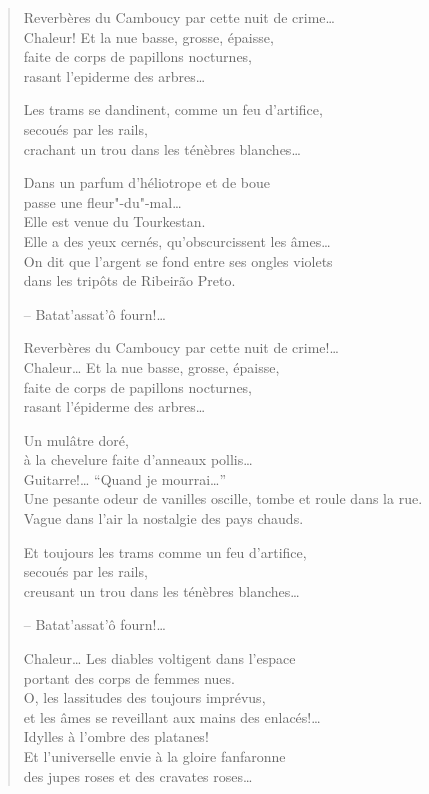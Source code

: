 \begin{verse}
Reverbères du Camboucy par cette nuit de crime\ldots{}\\
Chaleur! Et la nue basse, grosse, épaisse,\\
faite de corps de papillons nocturnes,\\
rasant l'epiderme des arbres\ldots{}

Les trams se dandinent, comme un feu d'artifice,\\
secoués par les rails,\\
crachant un trou dans les ténèbres blanches\ldots{}

Dans un parfum d'héliotrope et de boue\\
passe une fleur"-du"-mal\ldots{}\\
Elle est venue du Tourkestan.\\
Elle a des yeux cernés, qu'obscurcissent les âmes\ldots{}\\
On dit que l'argent se fond entre ses ongles violets\\
dans les tripôts de Ribeirão Preto.

-- Batat'assat'ô fourn!\ldots{}

Reverbères du Camboucy par cette nuit de crime!\ldots{}\\
Chaleur\ldots{} Et la nue basse, grosse, épaisse,\\
faite de corps de papillons nocturnes,\\
rasant l'épiderme des arbres\ldots{}

Un mulâtre doré,\\
à la chevelure faite d'anneaux pollis\ldots{}\\
Guitarre!\ldots{} ``Quand je mourrai\ldots{}''\\
Une pesante odeur de vanilles oscille, tombe et roule dans la rue.\\
Vague dans l'air la nostalgie des pays chauds.

Et toujours les trams comme un feu d'artifice,\\
secoués par les rails,\\
creusant un trou dans les ténèbres blanches\ldots{}

-- Batat'assat'ô fourn!\ldots{}

Chaleur\ldots{} Les diables voltigent dans l'espace\\
portant des corps de femmes nues.\\
O, les lassitudes des toujours imprévus,\\
et les âmes se reveillant aux mains des enlacés!\ldots{}\\
Idylles à l'ombre des platanes!\\
Et l'universelle envie à la gloire fanfaronne\\
des jupes roses et des cravates roses\ldots{}


\end{verse}
